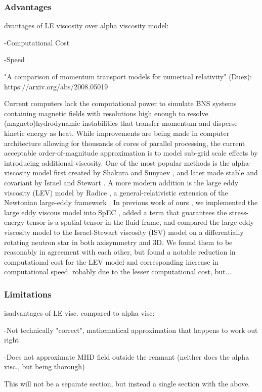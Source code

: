 \documentclass[%
twocolumn,
superscriptaddress,
nofootinbib,
 amsmath,amssymb,
 aps, prd
]{revtex4-2}
\newcommand{\alex}[1]{\color{red}{#1}}
\begin{document}
      \subsubsection{Advantages}

         {\alex 
        Advantages of LE viscosity over alpha viscosity model:

          -Computational Cost

          -Speed

          "A comparison of momentum transport models for numerical relativity" (Duez): https://arxiv.org/abs/2008.05019}

        Current computers lack the computational power to simulate BNS systems containing magnetic fields with resolutions high enough to resolve (magneto)hydrodynamic instabilities that transfer momentum and disperse kinetic energy as heat.
        While improvements are being made in computer architecture allowing for thousands of cores of parallel processing, the current acceptable order-of-magnitude approximation is to model sub-grid scale effects by introducing additional viscosity.
        One of the most popular methods is the alpha-viscosity model first created by Shakura and Sunyaev \cite{Shakura_1973}, and later made stable and covariant by Israel and Stewart \cite{Israel_1979}.
        A more modern addition is the large eddy viscosity (LEV) model by Radice \cite{Radice_2017, Radice_2018}, a general-relativistic extension of the Newtonian large-eddy framework \cite{Miesch_2015}.
        In previous work of ours \cite{Duez_2020}, we implemented the large eddy viscous model into SpEC \cite{spec}, added a term that guarantees the stress-energy tensor is a spatial tensor in the fluid frame, and compared the large eddy viscosity model to the Israel-Stewart viscosity (ISV) model on a differentially rotating neutron star in both axisymmetry and 3D.
        We found them to be reasonably in agreement with each other, but found a notable reduction in computational cost for the LEV model and corresponding increase in computational speed. 
        {\alex Probably due to the lesser computational cost, but...}


      \subsubsection{Limitations}
      {\alex
        Disadvantages of LE visc. compared to alpha visc:

          -Not technically "correct", mathematical approximation that happens to work out right

          -Does not approximate MHD field outside the remnant (neither does the alpha visc., but being thorough)

          This will not be a separate section, but instead a single section with the above.
          }
       
\end{document}
